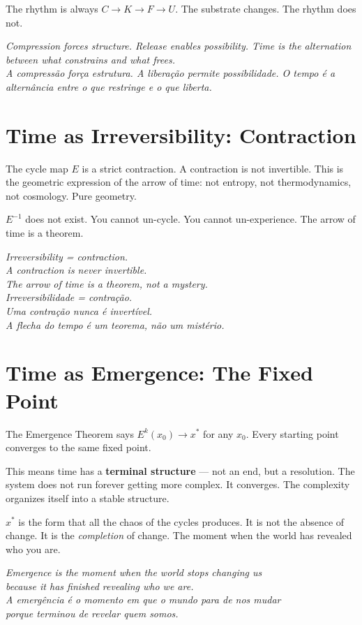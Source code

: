 \documentclass[12pt, openright]{book}
\newcommand{\bilingualq}[2]{%
  \begin{center}
  \begin{minipage}{0.85\textwidth}
  \small\color{beastblue}\itshape #1\\[0.3em]
  \color{gray}\itshape #2
  \end{minipage}
  \end{center}
}
\theoremstyle{definition}
\theoremstyle{remark}
\begin{document}
The rhythm is always $C \to K \to F \to U$.
The substrate changes. The rhythm does not.

\bilingualq{%
Compression forces structure. Release enables possibility.
Time is the alternation between what constrains and what frees.
}{%
A compressão força estrutura. A liberação permite possibilidade.
O tempo é a alternância entre o que restringe e o que liberta.}

\section{Time as Irreversibility: Contraction}

The cycle map $E$ is a strict contraction. A contraction is
not invertible. This is the geometric expression of the
arrow of time: not entropy, not thermodynamics, not cosmology.
Pure geometry.

$E^{-1}$ does not exist. You cannot un-cycle.
You cannot un-experience.
The arrow of time is a theorem.

\bilingualq{%
Irreversibility = contraction.\\
A contraction is never invertible.\\
The arrow of time is a theorem, not a mystery.
}{%
Irreversibilidade = contração.\\
Uma contração nunca é invertível.\\
A flecha do tempo é um teorema, não um mistério.}

\section{Time as Emergence: The Fixed Point}

The Emergence Theorem says $E^k(x_0) \to x^*$ for any $x_0$.
Every starting point converges to the same fixed point.

This means time has a \textbf{terminal structure} ---
not an end, but a resolution. The system does not run
forever getting more complex. It converges. The complexity
organizes itself into a stable structure.

$x^*$ is the form that all the chaos of the cycles produces.
It is not the absence of change. It is the \textit{completion}
of change. The moment when the world has revealed who you are.

\bilingualq{%
Emergence is the moment when the world stops changing us\\
because it has finished revealing who we are.
}{%
A emergência é o momento em que o mundo para de nos mudar\\
porque terminou de revelar quem somos.}
\end{document}
